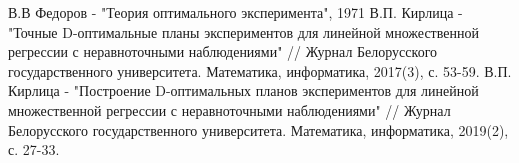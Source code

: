 \begin{thebibliography}{}
	 В.В Федоров - "Теория оптимального эксперимента", 1971
	 В.П. Кирлица - "Точные  D-оптимальные планы экспериментов для линейной множественной регрессии с неравноточными наблюдениями" // Журнал Белорусского государственного университета. Математика, информатика, 2017(3), с. 53-59.
	 В.П. Кирлица - "Построение  D-оптимальных  планов экспериментов для линейной множественной регрессии с неравноточными наблюдениями" // Журнал Белорусского государственного университета. Математика, информатика, 2019(2), с. 27-33.
\end{thebibliography}

